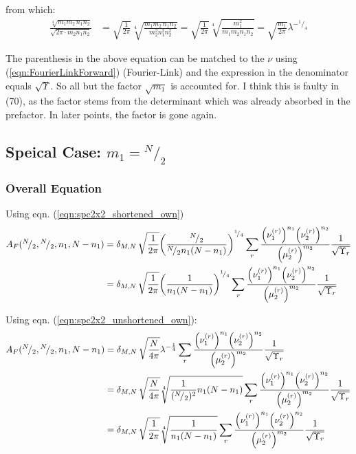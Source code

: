\documentclass[
	english,
	a4paper,
	fontsize=10pt,
	parskip=half,
	titlepage=true,
	DIV=12,
	final
]{scrreprt}
\newcommand*{\smallfrac}  [2]{\ensuremath{{}^        {#1} \!/_        {#2}}}
\begin{document}
from which:
\begin{align}
	\frac
		{\sqrt[4]{m_1 m_2 \, n_1 n_2}}
		{\sqrt{2\pi \cdot m_2 n_1 n_2}}
&=
	\sqrt{\frac{1}{2\pi}}
	\sqrt[4]{\frac
		{m_1 m_2 \, n_1 n_2}
		{m_2^2 n_1^2 n_2^2}
	}
=
	\sqrt{\frac{1}{2\pi}}
	\sqrt[4]{\frac
		{m_1^2 }
		{m_1 m_2 n_1 n_2}
	}
=
	\sqrt{\frac{m_1}{2\pi}} \lambda^{-\smallfrac{1}{4}}
\end{align}

The parenthesis in the above equation can be matched to the $\nu$ using (\ref{eqn:FourierLinkForward}) (Fourier-Link) and the expression in the denominator equals $\sqrt{\Upsilon}$. So {\color{red} all but the factor $\sqrt{m_1}$} is accounted for. I think this is faulty in (70), as the factor stems from the determinant which was already absorbed in the prefactor. In later points, the factor is gone again.

\subsection{Speical Case: $m_1 = \smallfrac{N}{2}$}
\subsubsection{Overall Equation}
Using eqn. (\ref{eqn:spc2x2_shortened_own})
\begin{align}
		A_F(\smallfrac{N}{2}, \smallfrac{N}{2}, n_1, N - n_1)
&=
	\delta_{M,N} \,
	\sqrt{\frac{1}{2\pi}}
	\qty(
		\frac{\smallfrac{N}{2}}{\smallfrac{N}{2} n_1 (N - n_1)}
	)^{\smallfrac{1}{4}}
	\sum_{r}	
		\frac
			{\qty(\nu_1^{(r)})^{n_1}   \qty(\nu_2^{(r)})^{n_2}}
			{\qty(\mu_2^{(r)})^{m_2}}
		\frac{1}{\sqrt{\Upsilon_r}} \\
&=
	\delta_{M,N} \,
	\sqrt{\frac{1}{2\pi}}
	\qty(
		\frac{1}{n_1 (N - n_1)}
	)^{\smallfrac{1}{4}}
	\sum_{r}	
		\frac
			{\qty(\nu_1^{(r)})^{n_1}   \qty(\nu_2^{(r)})^{n_2}}
			{\qty(\mu_2^{(r)})^{m_2}}
		\frac{1}{\sqrt{\Upsilon_r}}
\end{align}

Using eqn. (\ref{eqn:spc2x2_unshortened_own}):
\begin{align}
		A_F(\smallfrac{N}{2}, \smallfrac{N}{2}, n_1, N - n_1)
&=
	\delta_{M,N} \,
	\sqrt{\frac{N}{4\pi}}
	\lambda^{-\frac{1}{4}}
	\sum_{r}	
		\frac
			{\qty(\nu_1^{(r)})^{n_1}   \qty(\nu_2^{(r)})^{n_2}}
			{\qty(\mu_2^{(r)})^{m_2}}
		\frac{1}{\sqrt{\Upsilon_r}} \\
&=
	\delta_{M,N} \,
	\sqrt{\frac{N}{4\pi}}
	\sqrt[4]{\frac{1}{(\smallfrac{N}{2})^2} n_1 (N - n_1)}
	\sum_{r}	
		\frac
			{\qty(\nu_1^{(r)})^{n_1}   \qty(\nu_2^{(r)})^{n_2}}
			{\qty(\mu_2^{(r)})^{m_2}}
		\frac{1}{\sqrt{\Upsilon_r}} \\
&=
	\delta_{M,N} \,
	\sqrt{\frac{1}{2\pi}}
	\sqrt[4]{\frac{1}{n_1 (N - n_1)}}
	\sum_{r}	
		\frac
			{\qty(\nu_1^{(r)})^{n_1}   \qty(\nu_2^{(r)})^{n_2}}
			{\qty(\mu_2^{(r)})^{m_2}}
		\frac{1}{\sqrt{\Upsilon_r}}
\end{align}
\end{document}
